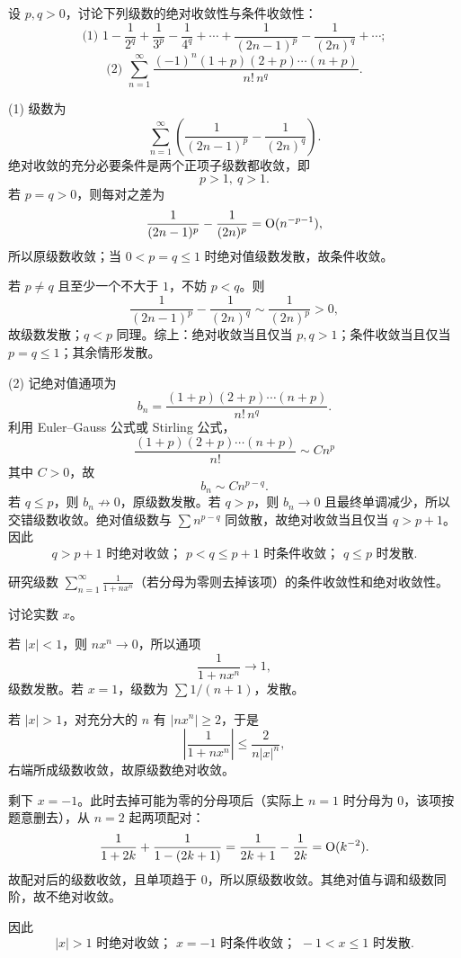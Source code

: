 \begin{xexercise}[4]
设 $p,q>0$，讨论下列级数的绝对收敛性与条件收敛性：
\[
\text{(1) }1-\frac1{2^q}+\frac1{3^p}-\frac1{4^q}+\cdots+\frac1{(2n-1)^p}-\frac1{(2n)^q}+\cdots;
\]
\[
\text{(2) }\sum_{n=1}^{\infty}\frac{(-1)^n(1+p)(2+p)\cdots(n+p)}{n!\,n^q}.
\]
\end{xexercise}
\begin{xsolution}
(1) 级数为
\[
 \sum_{n=1}^{\infty}\left(\frac1{(2n-1)^p}-\frac1{(2n)^q}\right).
\]
绝对收敛的充分必要条件是两个正项子级数都收敛，即
\[
 \boxed{p>1,\ q>1}.
\]
若 $p=q>0$，则每对之差为
\[
 \frac1{(2n-1)^p}-\frac1{(2n)^p}=\mathrm{O}(n^{-p-1}),
\]
所以原级数收敛；当 $0<p=q\leq1$ 时绝对值级数发散，故条件收敛。

若 $p\neq q$ 且至少一个不大于 $1$，不妨 $p<q$。则
\[
 \frac1{(2n-1)^p}-\frac1{(2n)^q}\sim\frac1{(2n)^p}>0,
\]
故级数发散；$q<p$ 同理。综上：绝对收敛当且仅当 $p,q>1$；条件收敛当且仅当 $p=q\leq1$；其余情形发散。

(2) 记绝对值通项为
\[
 b_n=\frac{(1+p)(2+p)\cdots(n+p)}{n!\,n^q}.
\]
利用 Euler--Gauss 公式或 Stirling 公式，
\[
 \frac{(1+p)(2+p)\cdots(n+p)}{n!}\sim Cn^p
\]
其中 $C>0$，故
\[
 b_n\sim Cn^{p-q}.
\]
若 $q\leq p$，则 $b_n\not\to0$，原级数发散。若 $q>p$，则 $b_n\to0$ 且最终单调减少，所以交错级数收敛。绝对值级数与 $\sum n^{p-q}$ 同敛散，故绝对收敛当且仅当 $q>p+1$。因此
\[
 \boxed{q>p+1\text{ 时绝对收敛； }p<q\leq p+1\text{ 时条件收敛； }q\leq p\text{ 时发散}.}
\]
\end{xsolution}


\begin{xexercise}[5]
研究级数 $\sum_{n=1}^{\infty}\frac1{1+nx^n}$（若分母为零则去掉该项）的条件收敛性和绝对收敛性。
\end{xexercise}
\begin{xsolution}
讨论实数 $x$。

若 $|x|<1$，则 $nx^n\to0$，所以通项
\[
 \frac1{1+nx^n}\to1,
\]
级数发散。若 $x=1$，级数为 $\sum1/(n+1)$，发散。

若 $|x|>1$，对充分大的 $n$ 有 $|nx^n|\geq2$，于是
\[
 \left|\frac1{1+nx^n}\right|\leq\frac2{n|x|^n},
\]
右端所成级数收敛，故原级数绝对收敛。

剩下 $x=-1$。此时去掉可能为零的分母项后（实际上 $n=1$ 时分母为 $0$，该项按题意删去），从 $n=2$ 起两项配对：
\[
 \frac1{1+2k}+\frac1{1-(2k+1)}
 =\frac1{2k+1}-\frac1{2k}
 =\mathrm{O}(k^{-2}).
\]
故配对后的级数收敛，且单项趋于 $0$，所以原级数收敛。其绝对值与调和级数同阶，故不绝对收敛。

因此
\[
 \boxed{|x|>1\text{ 时绝对收敛； }x=-1\text{ 时条件收敛； }-1<x\leq1\text{ 时发散}.}
\]
\end{xsolution}


